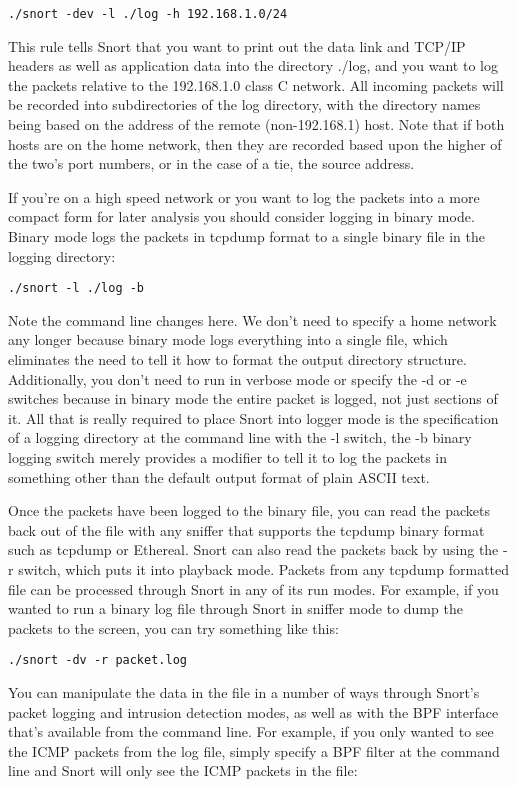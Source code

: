 \documentclass[english]{report}
\begin{document}
\begin{verbatim}
./snort -dev -l ./log -h 192.168.1.0/24
\end{verbatim}
This rule tells Snort that you want to print out the data link and
TCP/IP headers as well as application data into the directory ./log,
and you want to log the packets relative to the 192.168.1.0 class
C network. All incoming packets will be recorded into subdirectories
of the log directory, with the directory names being based on the
address of the remote (non-192.168.1) host. Note that if both hosts
are on the home network, then they are recorded based upon the higher
of the two's port numbers, or in the case of a tie, the source address.

If you're on a high speed network or you want to log the packets into
a more compact form for later analysis you should consider logging
in binary mode. Binary mode logs the packets in
tcpdump format to a single binary file in the
logging directory:

\begin{verbatim}
./snort -l ./log -b
\end{verbatim}
Note the command line changes here. We don't need to specify a home
network any longer because binary mode logs everything into a single
file, which eliminates the need to tell it how to format the output
directory structure. Additionally, you don't need to run in verbose
mode or specify the -d or -e switches because in binary mode the entire
packet is logged, not just sections of it. All that is really required
to place Snort into logger mode is the specification of a logging
directory at the command line with the -l switch, the -b binary logging
switch merely provides a modifier to tell it to log the packets in
something other than the default output format of plain ASCII text.

Once the packets have been logged to the binary file, you can read
the packets back out of the file with any sniffer that supports the
tcpdump binary format such as tcpdump or Ethereal. Snort can also
read the packets back by using the -r switch, which puts it into playback
mode. Packets from any tcpdump formatted file can be processed through
Snort in any of its run modes. For example, if you wanted to run a
binary log file through Snort in sniffer mode to dump the packets
to the screen, you can try something like this:

\begin{verbatim}
./snort -dv -r packet.log
\end{verbatim}
You can manipulate the data in the file in a number of ways through
Snort's packet logging and intrusion detection modes, as well as with
the BPF interface that's available from the command line. For example,
if you only wanted to see the ICMP packets from the log file, simply
specify a BPF filter at the command line and Snort will only see
the ICMP packets in the file:
\end{document}
